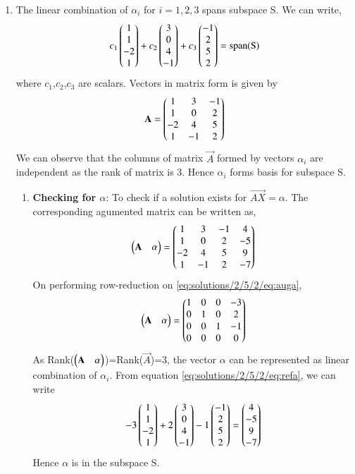\begin{enumerate}
\item The linear combination of $\alpha_i$ for $i=1,2,3$ spans subspace S. We can write,
\begin{align}
c_1\begin{pmatrix}1\\1\\-2\\1\end{pmatrix}+c_2\begin{pmatrix}3\\0\\4\\-1\end{pmatrix}+c_3\begin{pmatrix}-1\\2\\5\\2\end{pmatrix}=\text{span(S)}
\end{align}
where $c_1$,$c_2$,$c_3$ are scalars.
Vectors in matrix form is given by
\begin{align}
\mathbf{A}=\begin{pmatrix}1&3&-1\\1&0&2\\-2&4&5\\1&-1&2\end{pmatrix}
\end{align}
We can observe that the columns of matrix $\vec{A}$ formed by vectors $\alpha_i$ are independent as the rank of matrix is 3. Hence $\alpha_i$ forms basis for subspace S.
\begin{enumerate}
\item \textbf{Checking for $\alpha$}:
To check if a solution exists for $\vec{AX}=\alpha$. The corresponding agumented matrix can be written as,
\begin{align} \label{eq:solutions/2/5/2/eq:auga}
\begin{pmatrix}\mathbf{A}&\alpha\end{pmatrix}=\begin{pmatrix}1&3&-1&4\\1&0&2&-5\\-2&4&5&9\\1&-1&2&-7\end{pmatrix}
\end{align}
On performing row-reduction on \eqref{eq:solutions/2/5/2/eq:auga}, 
\begin{align}\label{eq:solutions/2/5/2/eq:refa}
\begin{pmatrix}\mathbf{A}&\alpha\end{pmatrix}=\begin{pmatrix}1&0&0&-3\\0&1&0&2\\0&0&1&-1\\0&0&0&0\end{pmatrix}
\end{align}
As Rank($\begin{pmatrix}\mathbf{A}&\alpha\end{pmatrix}$)=Rank($\vec{A}$)=3, the vector $\alpha$ can be represented as linear combination of $\alpha_i$. From equation \eqref{eq:solutions/2/5/2/eq:refa}, we can write
\begin{align}
-3\begin{pmatrix}1\\1\\-2\\1\end{pmatrix}+2\begin{pmatrix}3\\0\\4\\-1\end{pmatrix}-1\begin{pmatrix}-1\\2\\5\\2\end{pmatrix}=\begin{pmatrix}4\\-5\\9\\-7\end{pmatrix}
\end{align}
Hence $\alpha$ is in the subspace S.


\end{enumerate}
\end{enumerate}
